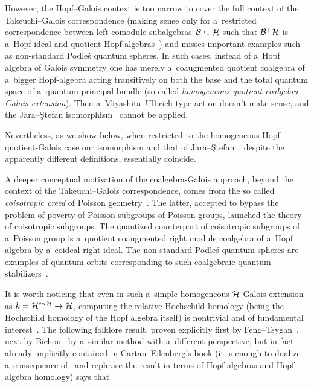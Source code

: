 \documentclass[pdftex]{sigma}
\numberwithin{equation}{section}
\DeclareMathOperator{\co}{co}
\begin{document}
However, the Hopf--Galois context is too narrow to cover the full context of the Takeuchi--Galois correspondence (making
sense only for a~restricted correspondence between left comodule subalgebras ${\cal B}\subseteq {\cal H}$ such that ${\cal B}^{+}{\cal H}$ is a~Hopf ideal and quotient Hopf-algebras~\cite{Take72}) and misses
important examples such as non-standard Podle\'s quantum spheres.
In such cases, instead of a~Hopf algebra of Galois symmetry one has merely a~coaugmented quotient coalgebra of a~bigger
Hopf-algebra acting transitively on both the base and the total quantum space of a~quantum principal bundle (so called
\emph{homogeneous quotient-coalgebra-Galois extension}).
Then a~Miyashita--Ulbrich type action doesn't make sense, and the Jara--\c{S}tefan isomorphism~\cite[Theorem~3.7]{JaraStef06} cannot be applied.

Nevertheless, as we show below, when restricted to the homogeneous Hopf-quotient-Galois case our isomorphism and that of
Jara--\c{S}tefan~\cite[Theorem~3.7]{JaraStef06}, despite the apparently dif\/ferent def\/initions, essentially coincide.

A deeper conceptual motivation of the coalgebra-Galois approach, beyond the context of the Takeuchi--Galois
correspondence, comes from the so called \emph{coisotropic creed} of Poisson geo\-met\-ry~\cite{Lu93}.
The latter, accepted to bypass the problem of poverty of Poisson subgroups of Poisson groups, launched the theory of
coisotropic subgroups.
The quantized counterpart of coisotropic subgroups of a~Poisson group is a~quotient coaugmented right module coalgebra
of a~Hopf algebra by a~coideal right ideal.
The non-standard Podle\'s quantum spheres are examples of quantum orbits corresponding to such coalgebraic quantum
stabilizers~\cite{DijkKoor94}.

It is worth noticing that even in such a~simple homogeneous ${\cal H}$-Galois extension as $k={\cal H}^{\co{\cal H}}\to{\cal H}$,
computing the relative Hochschild homology (being the Hochschild homology of the Hopf algebra itself)
is nontrivial and of fundamental interest~\cite{Bich13,BrowZhan08,CollHartThom09,FengTsyg91,GinzKuma93,HadfKrah05}.
The following folklore result, proven explicitly f\/irst by Feng--Tsygan~\cite{FengTsyg91}, next by Bichon~\cite{Bich13} by
a~similar method with a~dif\/ferent perspective, but in fact already implicitly contained in Cartan--Eilenberg's book (it
is enough to dualize a~consequence of~\cite[Theorem~VIII.3.1]{CartEile56} and rephrase the result in terms of Hopf
algebras and Hopf algebra homology) says that
\end{document}
